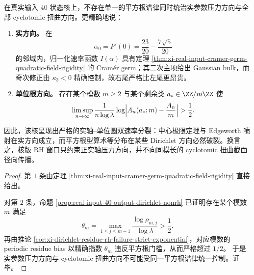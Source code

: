 \begin{corollary}\label{cor:xi-gaussian-but-nonrh-congruence-separation}
在真实输入 \(40\) 状态核上，不存在单一的平方根谱律同时统治实参数压力方向与全部 cyclotomic 扭曲方向。更精确地说：
\begin{enumerate}
  \item \textbf{实方向。} 在
  \[
  \alpha_0=P'(0)=\frac{23}{20}-\frac{7\sqrt5}{20}
  \]
  的邻域内，归一化速率函数 \(I(\alpha)\) 具有定理 \ref{thm:xi-real-input-cramer-germ-quadratic-field-rigidity} 的 Cram\'er germ；其二次主项给出 Gaussian bulk，而奇次修正由 \(\kappa_3<0\) 精确控制，故右尾严格比左尾更昂贵。
  \item \textbf{单位根方向。} 存在某个模数 \(m\ge 2\) 与某个剩余类 \(a_\ast\in\ZZ/m\ZZ\) 使
  \[
  \limsup_{n\to\infty}
  \frac{1}{n\log\lambda}
  \log\Bigl|A_n(a_\ast;m)-\frac{A_n}{m}\Bigr|
  >
  \frac12.
  \]
\end{enumerate}
因此，该核呈现出严格的实轴--单位圆双速率分裂：中心极限定理与 Edgeworth 喷射在实方向成立，而平方根型算术等分布在某些 Dirichlet 方向必然破裂。换言之，核版 RH 窗口只约束正实轴压力方向，并不向同模长的 cyclotomic 扭曲截面径向传播。
\end{corollary}
\begin{proof}
第 \(1\) 条由定理 \ref{thm:xi-real-input-cramer-germ-quadratic-field-rigidity} 直接给出。

对第 \(2\) 条，命题 \ref{prop:real-input-40-output-dirichlet-nonrh} 已证明存在某个模数 \(m\) 满足
\[
\theta_m=\max_{1\le j\le m-1}\frac{\log\rho_{m,j}}{\log\lambda}>\frac12.
\]
再由推论 \ref{cor:xi-dirichlet-residue-rh-failure-strict-exponential}，对应模数的 periodic residue bias 以精确指数 \(\theta_m\) 违反平方根门槛，从而严格超过 \(1/2\)。
于是实参数压力方向与 cyclotomic 扭曲方向不可能受同一平方根谱律统一控制。证毕。
\end{proof}

\endinput
